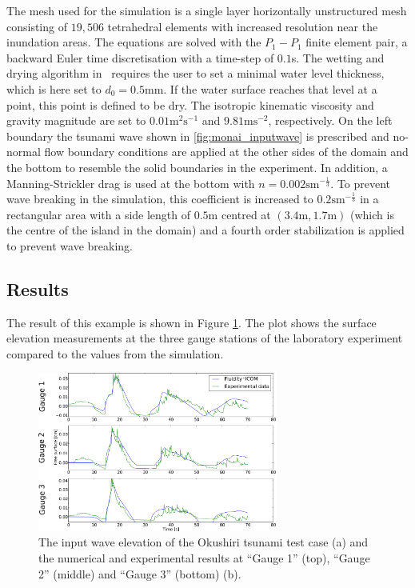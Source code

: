 The mesh used for the simulation is a single layer horizontally unstructured mesh consisting of $19,506$ tetrahedral elements with increased resolution near the inundation areas.
The equations are solved with the $P_1-P_1$ finite element pair, a backward Euler time discretisation with a time-step of $0.1$s.
The wetting and drying algorithm in \fluidity\ requires the user to set a minimal water level thickness, which is here set to $d_0=0.5$mm. If the water surface reaches that level at a point, this point is defined to be dry.
The isotropic kinematic viscosity and gravity magnitude are set to $0.01\mbox{m}^{2}\mbox{s}^{-1}$ and $9.81\mbox{ms}^{-2}$, respectively.
On the left boundary the tsunami wave shown in \ref{fig:monai_inputwave} is prescribed and no-normal flow boundary conditions are applied at the other sides of the domain and the bottom to resemble the solid boundaries in the experiment.
In addition, a Manning-Strickler drag is used at the bottom with $n=0.002\mbox{sm}^{-\frac{1}{3}}$.
To prevent wave breaking in the simulation, this coefficient is increased to $0.2\mbox{sm}^{-\frac{1}{3}}$ in a rectangular area with a side length of $0.5$m centred at $(3.4\mbox{m}, 1.7\mbox{m})$ (which is the centre of the island in the domain) and a fourth order stabilization is applied to prevent wave breaking. 

\subsection{Results}
The result of this example is shown in Figure \ref{fig:monai_results}. 
The plot shows the surface elevation measurements at the three gauge stations of the laboratory experiment compared to the values from the simulation.
\begin{figure}
\begin{center}
\includegraphics[width=0.7\textwidth]{./examples_images/hokkaido-nansei-oki_tsunami/MonaiValley_C_p1p1_nu0_01_kmkstab_drag0_002_butcircularoundisland0_2-crop-crop_final2.pdf}
\caption{The input wave elevation of the Okushiri tsunami test case (a) and the numerical and experimental results at ``Gauge 1'' (top), ``Gauge 2'' (middle) and ``Gauge 3'' (bottom) (b).}\label{fig:monai_results}
\end{center}
\end{figure}

